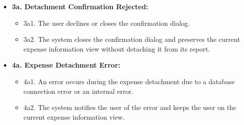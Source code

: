 \begin{itemize} [label={}, leftmargin=0.75cm, noitemsep]

    \item \textbf{3a. Detachment Confirmation Rejected:}
    \begin{itemize} [label={}, leftmargin=0.75cm, noitemsep]
        \item 3a1. The user declines or closes the confirmation dialog.
        \item 3a2. The system closes the confirmation dialog and preserves the current expense information view without detaching it from its report.
    \end{itemize}

    \item \textbf{4a. Expense Detachment Error:}
    \begin{itemize} [label={}, leftmargin=0.75cm, noitemsep]
        \item 4a1. An error occurs during the expense detachment due to a database connection error or an internal error.
        \item 4a2. The system notifies the user of the error and keeps the user on the current expense information view.
    \end{itemize}

\end{itemize}

\vspace{0.3cm}
